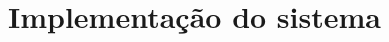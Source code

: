 \section{Implementação do sistema}
\begin{comment}

\label{sec:implementacao}

Os pasos para fazer o sistema de planejamento clássico (implementado em python) são os seguintes:
	\begin{itemize}
		\item Parser de STRIPS para Json
		\item Pre processamento do archivo com o estado inicial e a meta
		\item Parser de Json para CNF
		\item Adicionamento de ações (aumento em tamanho do plano de solução)
		\item Interprete de CNF para Json
	\end{itemize}
O pseudocódigo~\ref{lst:solver} mostra o algoritmo usado pelo sistema de planejamento para a busca de solução para um problema dado (para SAT-Plan e Blackbox).
	\renewcommand \lstlistingname{Pseudocódigo}
	\begin{lstlisting}[ caption = Algoritmo de busca , label = lst:solver ]
		Function Solve
			While true
				Add axioms for one more level |\label{code:addaxiom}|
				cnf = generate CNF |\label{code:gencnf}|
				model = SAT_Solver( cnf ) |\label{code:satsolver}|
				If model exists then
					Sol = extract solution |\label{code:extract}|
					break
				End If
			End While
			Return Sol
		End Function
	\end{lstlisting}
A linha~\ref{code:addaxiom} será explicada nas seções~\ref{subsec:satplanaxioms} e~\ref{subsec:blackboxaxioms} para o algoritmo SAT-Plan e Blackbox respectivamente. Além,as linhas~\ref{code:gencnf} e \ref{code:extract} seram explicadas nas subseções \ref{subsec:jsoncnf} e \ref{subsec:cnfjson} respectivamente. Por último, o SAT-solver da linha~\ref{code:satsolver} já está implementado e só sera usado. Toda a implementação está no archivo ${solver.py}$, mas as funções específicas de cada algoritmo estão nos archivos ${satplan.py}$ e ${blackbox.py}$ para cada algoritmo do mesmo nome.

\subsection{Definições previas}
	\subsubsection{SAT-Plan}
	\label{subsub:satplan}
		Este algoritmo muda todas as ações e fluentes em STRIPS para sentencias lógicas e usando um SAT-solver busca se existe uma solução para o problema, caso contrário adiciona um novo nível ao plano de solução.
	

\end{comment}
